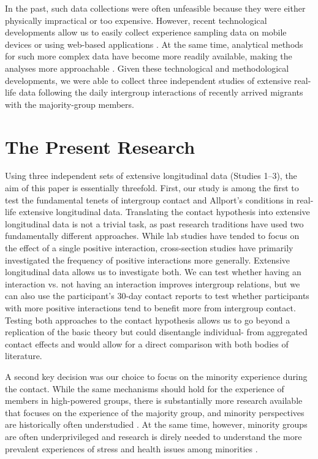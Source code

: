 \documentclass[man, 12pt, a4paper, mask]{apa7}
\theoremstyle{break}
\theoremstyle{plain}
\begin{document}
In the past, such data collections were often unfeasible because they were either physically impractical or too expensive. However, recent technological developments allow us to easily collect experience sampling data on mobile devices \citep[e.g.,][]{Keil2020} or using web-based applications \citep[e.g.,][]{Arslan2020}. At the same time, analytical methods for such more complex data have become more readily available, making the analyses more approachable \citep[e.g., see][]{ODonnell2021}. Given these technological and methodological developments, we were able to collect three independent studies of extensive real-life data following the daily intergroup interactions of recently arrived migrants with the majority-group members.  

\section{The Present Research}
Using three independent sets of extensive longitudinal data (Studies 1–3), the aim of this paper is essentially threefold. First, our study is among the first to test the fundamental tenets of intergroup contact and Allport's conditions in real-life extensive longitudinal data. Translating the contact hypothesis into extensive longitudinal data is not a trivial task, as past research traditions have used two fundamentally different approaches. While lab studies have tended to focus on the effect of a single positive interaction, cross-section studies have primarily investigated the frequency of positive interactions more generally. Extensive longitudinal data allows us to investigate both. We can test whether having an interaction vs. not having an interaction improves intergroup relations, but we can also use the participant's 30-day contact reports to test whether participants with more positive interactions tend to benefit more from intergroup contact. Testing both approaches to the contact hypothesis allows us to go beyond a replication of the basic theory but could disentangle individual- from aggregated contact effects and would allow for a direct comparison with both bodies of literature. 

A second key decision was our choice to focus on the minority experience during the contact. While the same mechanisms should hold for the experience of members in high-powered groups, there is substantially more research available that focuses on the experience of the majority group, and minority perspectives are historically often understudied \citep[e.g.,][]{Dovidio2017}. At the same time, however, minority groups are often underprivileged and research is direly needed to understand the more prevalent experiences of stress and health issues among minorities \citep[e.g.,][]{alvidrez2019}. 
\end{document}
